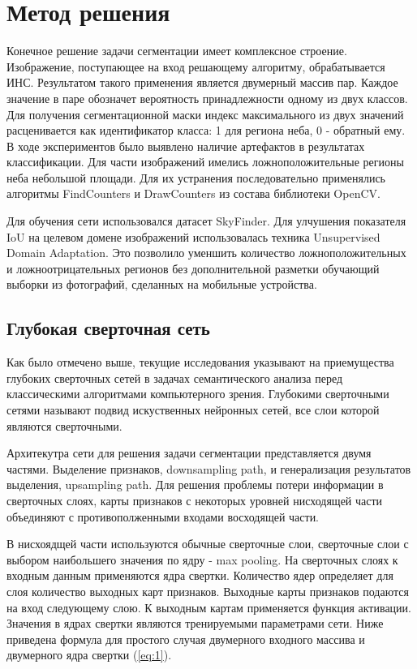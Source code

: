 \section{Метод решения}

Конечное решение задачи сегментации имеет комплексное строение. Изображение, поступающее на вход решающему алгоритму, обрабатывается ИНС. Результатом такого применения является двумерный массив пар. Каждое значение в паре обозначет вероятность принадлежности одному из двух классов. Для получения сегментационной маски индекс максимального из двух значений расценивается как идентификатор класса: 1 для региона неба, 0 - обратный ему. В ходе экспериментов было выявлено наличие артефактов в результатах классификации. Для части изображений имелись ложноположительные регионы неба небольшой площади. Для их устранения последовательно применялись алгоритмы FindCounters и DrawCounters из состава библиотеки OpenCV. 

Для обучения сети использовался датасет SkyFinder. Для улчушения показателя IoU на целевом домене изображений использовалась техника Unsupervised Domain Adaptation. Это позволило уменшить количество ложноположительных и ложноотрицательных регионов без дополнительной разметки обучающий выборки из фотографий, сделанных на мобильные устройства.

\subsection{Глубокая сверточная сеть}

Как было отмечено выше, текущие исследования указывают на приемущества глубоких сверточных сетей в задачах семантического анализа перед классическими алгоритмами компьютерного зрения. Глубокими сверточными сетями называют подвид искуственных нейронных сетей, все слои которой являются сверточными. 

Архитекутра сети для решения задачи сегментации представляется двумя частями. Выделение признаков, downsampling path, и генерализация результатов выделения, upsampling path. Для решения проблемы потери информации в сверточных слоях, карты признаков с некоторых уровней нисходящей части объединяют с противополженными входами восходящей части.

В нисхоядщей части используются обычные сверточные слои, сверточные слои с выбором наибольшего значения по ядру - max pooling. На сверточных слоях к входным данным применяются ядра свертки. Количество ядер определяет для слоя количество выходных карт признаков. Выходные карты признаков подаются на вход следующему слою. К выходным картам применяется функция активации. Значения в ядрах свертки являются тренируемыми параметрами сети. Ниже приведена формула для простого случая двумерного входного массива и двумерного ядра свертки (\ref{eq:1}).

